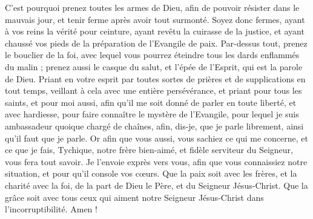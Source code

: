 \begin{multicols}{2}
C'est pourquoi prenez toutes les armes de Dieu, afin de pouvoir résister dans le mauvais jour, et tenir ferme après avoir tout surmonté.
Soyez donc fermes, ayant à vos reins la vérité pour ceinture, ayant revêtu la cuirasse de la justice,
et ayant chaussé vos pieds de la préparation de l’Evangile de paix.
Par-dessus tout, prenez le bouclier de la foi, avec lequel vous pourrez éteindre tous les dards enflammés du malin ;
prenez aussi le casque du salut, et l'épée de l'Esprit, qui est la parole de Dieu.
Priant en votre esprit par toutes sortes de prières et de supplications en tout temps, veillant à cela avec une entière persévérance, et priant pour tous les saints,
et pour moi aussi, afin qu'il me soit donné de parler en toute liberté, et avec hardiesse, pour faire connaître le mystère de l'Evangile,
pour lequel je suis ambassadeur quoique chargé de chaînes, afin, dis-je, que je parle librement, ainsi qu'il faut que je parle.
Or afin que vous aussi, vous sachiez ce qui me concerne, et ce que je fais, Tychique, notre frère bien-aimé, et fidèle serviteur du Seigneur, vous fera tout savoir.
Je l'envoie exprès vers vous, afin que vous connaissiez notre situation, et pour qu'il console vos cœurs.
Que la paix soit avec les frères, et la charité avec la foi, de la part de Dieu le Père, et du Seigneur Jésus-Christ.
Que la grâce soit avec tous ceux qui aiment notre Seigneur Jésus-Christ dans l’incorruptibilité. Amen !
\PPE{}
\end{multicols}
